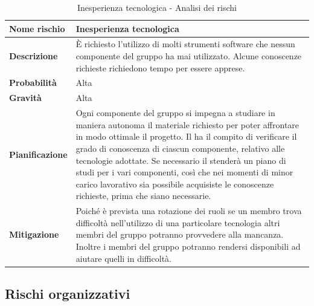 \documentclass[12pt,a4paper]{article}
\begin{document}
\begin{table}[H]
\begin{center}
\begin{tabular}{p{} p{}}
\toprule
\textbf{Nome rischio} & \textbf{Inesperienza tecnologica} \\
\midrule
\midrule
\textbf{Descrizione} & È richiesto l’utilizzo di molti strumenti software che nessun componente del gruppo ha mai utilizzato. Alcune conoscenze richieste richiedono tempo per
essere apprese. \\
\midrule
\textbf{Probabilità} & Alta \\
\midrule
\textbf{Gravità} & Alta \\
\midrule
\textbf{Pianificazione} & Ogni componente del gruppo si impegna a studiare in maniera autonoma il materiale richiesto per poter affrontare in modo ottimale il progetto. Il \PM{} ha il compito di verificare il grado di conoscenza di ciascun componente, relativo alle tecnologie adottate. Se necessario il \PM{} stenderà un piano di studi per i vari componenti, così che nei momenti di minor carico lavorativo sia possibile acquisiste le conoscenze richieste, prima che siano necessarie. \\
\midrule
\textbf{Mitigazione} & Poiché è prevista una rotazione dei ruoli se un membro trova difficoltà nell'utilizzo di una particolare tecnologia altri membri del gruppo potranno provvedere alla mancanza. Inoltre i membri del gruppo potranno rendersi disponibili ad aiutare quelli in difficoltà. \\
\bottomrule
\end{tabular}
\caption{Inesperienza tecnologica - Analisi dei rischi}
\end{center}
\end{table}

\subsection{Rischi organizzativi}
\end{document}
